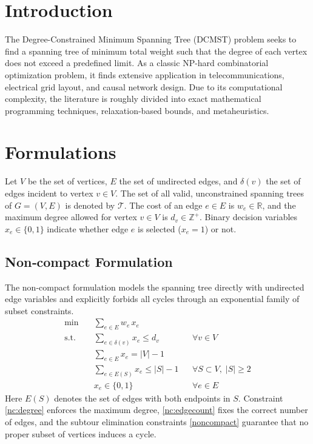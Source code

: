\documentclass[12pt]{article}
\begin{document}
\pagestyle{fancy}
\fancyhead{} %




\section{Introduction}
The Degree-Constrained Minimum Spanning Tree (DCMST) problem seeks to find a spanning tree of minimum total weight such that the degree of each vertex does not exceed a predefined limit. As a classic NP-hard combinatorial optimization problem, it finds extensive application in telecommunications, electrical grid layout, and causal network design. Due to its computational complexity, the literature is roughly divided into exact mathematical programming techniques, relaxation-based bounds, and metaheuristics.

\section{Formulations}

Let $V$ be the set of vertices, $E$ the set of undirected edges, and $\delta(v)$ the set of edges incident to vertex $v \in V$. 
The set of all valid, unconstrained spanning trees of $G=(V,E)$ is denoted by $\mathcal{T}$. 
The cost of an edge $e \in E$ is $w_e \in \mathbb{R}$, and the maximum degree allowed for vertex $v \in V$ is $d_v \in \mathbb{Z}^+$. 
Binary decision variables $x_e \in \{0,1\}$ indicate whether edge $e$ is selected ($x_e=1$) or not.

\subsection{Non‑compact Formulation} \label{sec:non-compact}
The non‑compact formulation models the spanning tree directly with undirected edge variables and explicitly forbids all cycles through an exponential family of subset constraints.
\begin{align}
\min \quad & \sum_{e \in E} w_e \, x_e \label{nc:obj} \\
\text{s.t.} \quad & \sum_{e \in \delta(v)} x_e \le d_v && \forall v\in V \label{nc:degree} \\
& \sum_{e \in E} x_e = |V| - 1 \label{nc:edgecount} \\
& \sum_{e \in E(S)} x_e \le |S| - 1 && \forall S \subset V,\; |S|\ge 2 \label{noncompact} \\
& x_e \in \{0,1\} && \forall e\in E \label{nc:binary}
\end{align}
Here $E(S)$ denotes the set of edges with both endpoints in $S$.  
Constraint \eqref{nc:degree} enforces the maximum degree, \eqref{nc:edgecount} fixes the correct number of edges, and the subtour elimination constraints \eqref{noncompact} guarantee that no proper subset of vertices induces a cycle.
\end{document}

